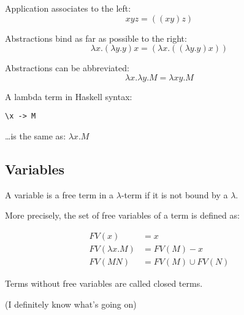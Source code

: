 Application associates to the left:
$$
xyz = ((xy)z)
$$

Abstractions bind as far as possible to the right:
$$
\lambda x.(\lambda y.y)x = (\lambda x.((\lambda y.y)x))
$$

Abstractions can be abbreviated:
$$
\lambda x.\lambda y.M = \lambda xy.M
$$

A lambda term in Haskell syntax:
\begin{lstlisting}
\x -> M
\end{lstlisting}

\ldots is the same as: $\lambda x.M$

\subsection{Variables}
A variable is a free term in a $\lambda$-term if it is not bound by a $\lambda$.

More precisely, the set of free variables of a term is defined as:

\begin{align}
FV(x) &= {x} \\
FV(\lambda x.M) &= FV(M)-{x} \\
FV(MN) &= FV(M) \cup FV(N)
\end{align}


Terms without free variables are called closed terms.

(I definitely know what's going on)